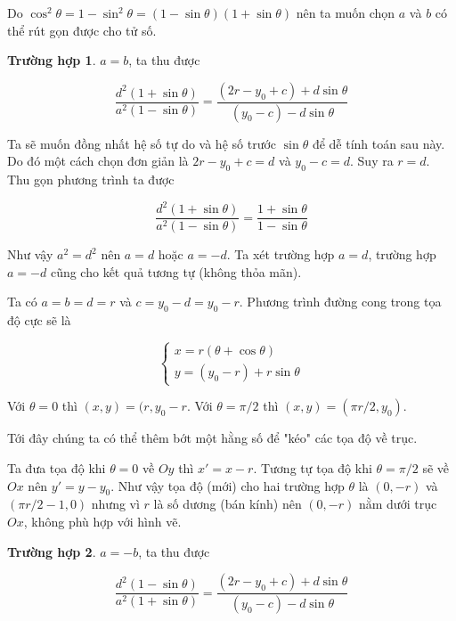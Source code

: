 \documentclass{article}
\begin{document}
Do $\cos^2 \theta = 1 - \sin^2 \theta = (1 - \sin \theta)(1 + \sin \theta)$ nên ta muốn chọn $a$ và $b$ có thể rút gọn được cho tử số. 

\textbf{Trường hợp 1}. $a = b$, ta thu được

\begin{equation*}
	\frac{d^2 (1 + \sin \theta)}{a^2 (1 - \sin \theta)} = \frac{(2 r - y_0 + c) + d \sin \theta}{(y_0 - c) - d \sin \theta}
\end{equation*}

Ta sẽ muốn đồng nhất hệ số tự do và hệ số trước $\sin \theta$ để dễ tính toán sau này. Do đó một cách chọn đơn giản là $2 r - y_0 + c = d$ và $y_0 - c = d$. Suy ra $r = d$. Thu gọn phương trình ta được

\begin{equation*}
	\frac{d^2 (1 + \sin \theta)}{a^2 (1 - \sin \theta)} = \frac{1 + \sin \theta}{1 - \sin \theta}
\end{equation*}

Như vậy $a^2 = d^2$ nên $a = d$ hoặc $a = -d$. Ta xét trường hợp $a = d$, trường hợp $a = -d$ cũng cho kết quả tương tự (không thỏa mãn). 

Ta có  $a = b = d = r$ và $c = y_0 - d = y_0 - r$. Phương trình đường cong trong tọa độ cực sẽ là

\begin{equation*}
	\begin{cases}
		x = r(\theta + \cos \theta) \\ y = (y_0 - r) + r \sin \theta
	\end{cases}
\end{equation*}

Với $\theta = 0$ thì $(x, y) = (r, y_0 - r$. Với $\theta = \pi / 2$ thì $(x, y) = (\pi r / 2, y_0)$.

Tới đây chúng ta có thể thêm bớt một hằng số để "kéo" các tọa độ về trục. 

Ta đưa tọa độ khi $\theta = 0$ về $Oy$ thì $x' = x - r$. Tương tự tọa độ khi $\theta = \pi / 2$ sẽ về $Ox$ nên $y' = y - y_0$. Như vậy tọa độ (mới) cho hai trường hợp $\theta$ là $(0, -r)$ và $(\pi r / 2 - 1, 0)$ nhưng vì $r$ là số dương (bán kính) nên $(0, -r)$ nằm dưới trục $Ox$, không phù hợp với hình vẽ.

\textbf{Trường hợp 2}. $a = -b$, ta thu được

\begin{equation*}
	\frac{d^2 (1 - \sin\theta)}{a^2 (1 + \sin\theta)} = \frac{(2r - y_0 + c) + d \sin\theta}{(y_0 - c) - d \sin\theta}
\end{equation*}
\end{document}
